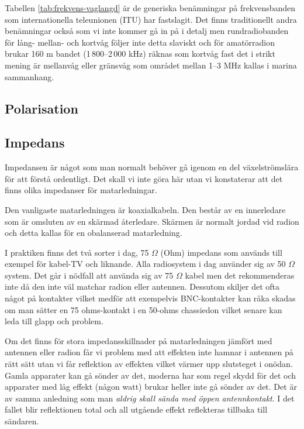 Tabellen \ref{tab:frekvens-vaglangd} är de generiska benämningar på frekvensbanden som internationella teleunionen (ITU) har fastslagit. Det finns traditionellt andra benämningar också som vi inte kommer gå in på i detalj men rundradiobanden för lång- mellan- och kortvåg följer inte detta slaviskt och för amatörradion brukar 160 m bandet (1\,800--2\,000 kHz) räknas som kortvåg fast det i strikt mening är mellanvåg eller gränsvåg som området mellan 1--3 MHz kallas i marina sammanhang.

\subsection{Polarisation}


\subsection{Impedans}

Impedansen är något som man normalt behöver gå igenom en del växelströmslära för att förstå ordentligt. Det skall vi inte göra här utan vi konstaterar att det finns olika impedanser för matarledningar.

Den vanligaste matarledningen är koaxialkabeln. Den består av en innerledare som är omsluten av en skärmad återledare. Skärmen är normalt jordad vid radion och detta kallas för en obalanserad matarledning. 

I praktiken finns det två sorter i dag, 75 $\Omega$ (Ohm) impedans som används till exempel för kabel-TV och liknande. Alla radiosystem i dag använder sig av 50 $\Omega$ system. Det går i nödfall att använda sig av 75 $\Omega$ kabel men det rekommenderas inte då den inte väl matchar radion eller antennen. Dessutom skiljer det ofta något på kontakter vilket medför att exempelvis BNC-kontakter kan råka skadas om man sätter en 75 ohms-kontakt i en 50-ohms chassiedon vilket senare kan leda till glapp och problem.

Om det finns för stora impedansskillnader på matarledningen jämfört med antennen eller radion får vi problem med att effekten inte hamnar i antennen på rätt sätt utan vi får reflektion av effekten vilket värmer upp slutsteget i onödan. Gamla apparater kan gå sönder av det, moderna har som regel skydd för det och apparater med låg effekt (någon watt) brukar heller inte gå sönder av det. Det är av samma anledning som man \textit{aldrig skall sända med öppen antennkontakt}. I det fallet blir reflektionen total och all utgående effekt reflekteras tillbaka till sändaren. 

